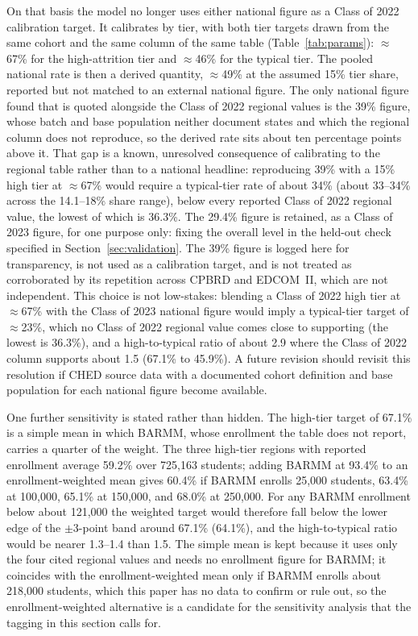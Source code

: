 \documentclass[11pt]{article}
\begin{document}
On that basis the model no longer uses either national figure as a Class of 2022 calibration target. It calibrates by tier, with both tier targets drawn from the same cohort and the same column of the same table (Table~\ref{tab:params}): $\approx$67\% for the high-attrition tier and $\approx$46\% for the typical tier. The pooled national rate is then a derived quantity, $\approx$49\% at the assumed 15\% tier share, reported but not matched to an external national figure. The only national figure found that is quoted alongside the Class of 2022 regional values is the 39\% figure, whose batch and base population neither document states and which the regional column does not reproduce, so the derived rate sits about ten percentage points above it. That gap is a known, unresolved consequence of calibrating to the regional table rather than to a national headline: reproducing 39\% with a 15\% high tier at $\approx$67\% would require a typical-tier rate of about 34\% (about 33--34\% across the 14.1--18\% share range), below every reported Class of 2022 regional value, the lowest of which is 36.3\%. The 29.4\% figure is retained, as a Class of 2023 figure, for one purpose only: fixing the overall level in the held-out check specified in Section~\ref{sec:validation}. The 39\% figure is logged here for transparency, is not used as a calibration target, and is not treated as corroborated by its repetition across CPBRD and EDCOM~II, which are not independent. This choice is not low-stakes: blending a Class of 2022 high tier at $\approx$67\% with the Class of 2023 national figure would imply a typical-tier target of $\approx$23\%, which no Class of 2022 regional value comes close to supporting (the lowest is 36.3\%), and a high-to-typical ratio of about 2.9 where the Class of 2022 column supports about 1.5 (67.1\% to 45.9\%). A future revision should revisit this resolution if CHED source data with a documented cohort definition and base population for each national figure become available.

One further sensitivity is stated rather than hidden. The high-tier target of 67.1\% is a simple mean in which BARMM, whose enrollment the table does not report, carries a quarter of the weight. The three high-tier regions with reported enrollment average 59.2\% over 725,163 students; adding BARMM at 93.4\% to an enrollment-weighted mean gives 60.4\% if BARMM enrolls 25,000 students, 63.4\% at 100,000, 65.1\% at 150,000, and 68.0\% at 250,000. For any BARMM enrollment below about 121,000 the weighted target would therefore fall below the lower edge of the $\pm$3-point band around 67.1\% (64.1\%), and the high-to-typical ratio would be nearer 1.3--1.4 than 1.5. The simple mean is kept because it uses only the four cited regional values and needs no enrollment figure for BARMM; it coincides with the enrollment-weighted mean only if BARMM enrolls about 218,000 students, which this paper has no data to confirm or rule out, so the enrollment-weighted alternative is a candidate for the sensitivity analysis that the tagging in this section calls for.
\end{document}
